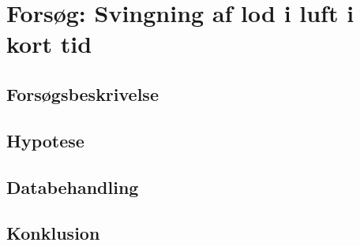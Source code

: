 \section{Forsøg: Svingning af lod i luft i kort tid}

\subsection{Forsøgsbeskrivelse}

\subsection{Hypotese}

\subsection{Databehandling}

\subsection{Konklusion}


